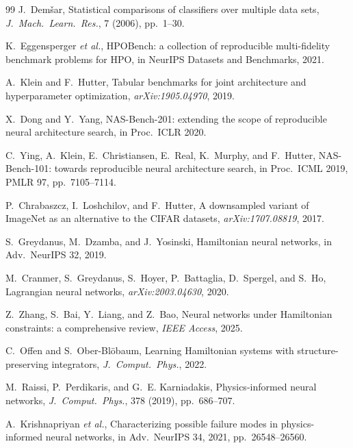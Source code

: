 \documentclass[11pt]{article}
\begin{document}
\begin{thebibliography}{99}
J.~Dem\v{s}ar,
Statistical comparisons of classifiers over multiple data sets,
\textit{J.\ Mach.\ Learn.\ Res.}, 7 (2006), pp.~1--30.

K.~Eggensperger \textit{et al.},
HPOBench: a collection of reproducible multi-fidelity benchmark
problems for HPO,
in NeurIPS Datasets and Benchmarks, 2021.

A.~Klein and F.~Hutter,
Tabular benchmarks for joint architecture and hyperparameter
optimization,
\textit{arXiv:1905.04970}, 2019.

X.~Dong and Y.~Yang,
NAS-Bench-201: extending the scope of reproducible neural
architecture search,
in Proc.\ ICLR 2020.

C.~Ying, A.~Klein, E.~Christiansen, E.~Real, K.~Murphy, and F.~Hutter,
NAS-Bench-101: towards reproducible neural architecture search,
in Proc.\ ICML 2019, PMLR 97, pp.~7105--7114.

P.~Chrabaszcz, I.~Loshchilov, and F.~Hutter,
A downsampled variant of ImageNet as an alternative to the CIFAR
datasets,
\textit{arXiv:1707.08819}, 2017.

S.~Greydanus, M.~Dzamba, and J.~Yosinski,
Hamiltonian neural networks,
in Adv.\ NeurIPS 32, 2019.

M.~Cranmer, S.~Greydanus, S.~Hoyer, P.~Battaglia, D.~Spergel, and S.~Ho,
Lagrangian neural networks,
\textit{arXiv:2003.04630}, 2020.

Z.~Zhang, S.~Bai, Y.~Liang, and Z.~Bao,
Neural networks under Hamiltonian constraints: a comprehensive review,
\textit{IEEE Access}, 2025.

C.~Offen and S.~Ober-Bl\"{o}baum,
Learning Hamiltonian systems with structure-preserving integrators,
\textit{J.\ Comput.\ Phys.}, 2022.

M.~Raissi, P.~Perdikaris, and G.~E. Karniadakis,
Physics-informed neural networks,
\textit{J.\ Comput.\ Phys.}, 378 (2019), pp.~686--707.

A.~Krishnapriyan \textit{et al.},
Characterizing possible failure modes in physics-informed neural networks,
in Adv.\ NeurIPS 34, 2021, pp.~26548--26560.


\end{thebibliography}
\end{document}
